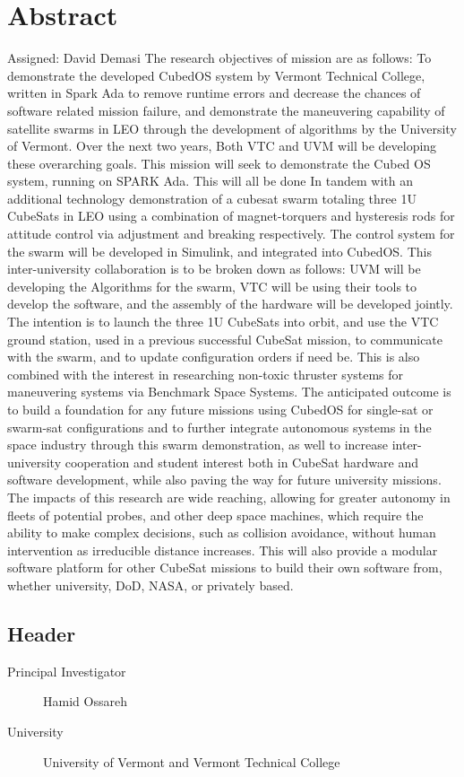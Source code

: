 \section{Abstract}
Assigned: David Demasi \cite{brandon:2008}
The research objectives of mission are as follows:  To demonstrate the developed CubedOS system by Vermont Technical College, written in Spark Ada to remove runtime errors and decrease the chances of software related mission failure, and demonstrate the maneuvering capability of satellite swarms in LEO through the development of algorithms by the University of Vermont.
Over the next two years, Both VTC and UVM will be developing these overarching goals. This mission will seek to demonstrate the Cubed OS system, running on SPARK Ada. This will all be done In tandem with an additional technology demonstration of a cubesat swarm totaling three 1U CubeSats in LEO using a combination of magnet-torquers and hysteresis rods for attitude control via adjustment and breaking respectively. The control system for the swarm will be developed in Simulink, and integrated into CubedOS. 
This inter-university collaboration is to be broken down as follows: UVM will be developing the Algorithms for the swarm, VTC will be using their tools to develop the software, and the assembly of the hardware will be developed jointly.
 The intention is to launch the three 1U CubeSats into orbit, and use the VTC ground station, used in a previous successful CubeSat mission, to communicate with the swarm, and to update configuration orders if need be. This is also combined with the interest in researching non-toxic thruster systems for maneuvering systems via Benchmark Space Systems.
	The anticipated outcome is to build a foundation for any future missions using CubedOS for single-sat or swarm-sat configurations and to further integrate autonomous systems in the space industry through this swarm demonstration, as well to increase inter-university cooperation and student interest both in CubeSat hardware and software development, while also paving the way for future university missions.
The impacts of this research are wide reaching, allowing for greater autonomy in fleets of potential probes, and other deep space machines, which require the ability to make complex decisions, such as collision avoidance, without human intervention as irreducible distance increases. This will also provide a modular software platform for other CubeSat missions to build their own software from, whether university, DoD, NASA, or privately based.

\subsection{Header}
\begin{description}
\item[Principal Investigator] Hamid Ossareh
\item[University] University of Vermont and Vermont Technical College
\end{description}


